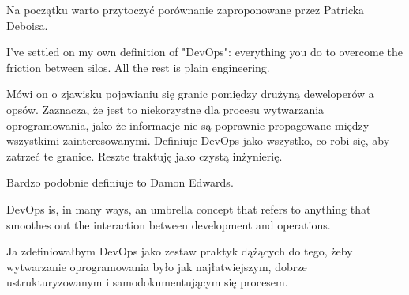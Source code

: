 \documentclass{article}
\begin{document}
Na początku warto przytoczyć porównanie zaproponowane przez Patricka Deboisa\cite{devOpsHandbook}.

\begin{displayquote}
    I've settled on my own definition of "DevOps": everything you do to overcome the friction between silos. All the rest is plain engineering.
\end{displayquote}

Mówi on o zjawisku pojawianiu się granic pomiędzy drużyną deweloperów a opsów. Zaznacza, że jest to niekorzystne dla procesu wytwarzania oprogramowania, jako że informacje nie są poprawnie propagowane między wszystkimi zainteresowanymi. Definiuje DevOps jako wszystko, co robi się, aby zatrzeć te granice. Reszte traktuję jako czystą inżynierię.
\newline

Bardzo podobnie definiuje to Damon Edwards\cite{damonEdwards}.

\begin{displayquote}
    DevOps is, in many ways, an umbrella concept that refers to anything that smoothes out the interaction between development and operations.
\end{displayquote}

Ja zdefiniowałbym DevOps jako zestaw praktyk dążących do tego, żeby wytwarzanie oprogramowania było jak najłatwiejszym, dobrze ustrukturyzowanym i samodokumentującym się procesem.
\end{document}
